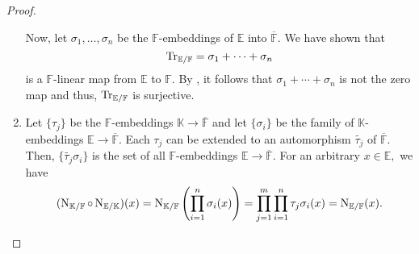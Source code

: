 \begin{proof}
\begin{enumerate}[leftmargin=*]
        Now, let $\sigma_1, \ldots, \sigma_n$ be the $\mathbb{F}$-embeddings of $\mathbb{E}$ into $\overline{\mathbb{F}}.$ We have shown that
        \begin{equation*} 
            \operatorname{Tr}_{\mathbb{E}/\mathbb{F}} = \sigma_1 + \cdots + \sigma_n
        \end{equation*}
        is a $\mathbb{F}$-linear map from $\mathbb{E}$ to $\mathbb{F}.$ By , it follows that $\sigma_1 + \cdots + \sigma_n$ is not the zero map and thus, $\operatorname{Tr}_{\mathbb{E}/\mathbb{F}}$ is surjective.
        \item Let $\{\tau_j\}$ be the $\mathbb{F}$-embeddings $\mathbb{K} \to \overline{\mathbb{F}}$ and let $\{\sigma_i\}$ be the family of $\mathbb{K}$-embeddings $\mathbb{E} \to \overline{\mathbb{F}}.$ Each $\tau_j$ can be extended to an automorphism $\widetilde{\tau_j}$ of $\overline{\mathbb{F}}.$ Then, $\{\widetilde{\tau_j}\sigma_i\}$ is the set of all $\mathbb{F}$-embeddings $\mathbb{E} \to \overline{\mathbb{F}}.$ For an arbitrary $x \in \mathbb{E},$ we have
        \begin{equation*} 
            (\operatorname{N}_{\mathbb{K}/\mathbb{F}} \circ \operatorname{N}_{\mathbb{E}/\mathbb{K}})(x) = \operatorname{N}_{\mathbb{K}/\mathbb{F}}\left(\prod_{i = 1}^{n} \sigma_i(x)\right) = \prod_{j = 1}^{m}\prod_{i = 1}^{n} \tau_j\sigma_i(x) = \operatorname{N}_{\mathbb{E}/\mathbb{F}}(x). \qedhere
        \end{equation*}
    \end{enumerate} 
\end{proof}

